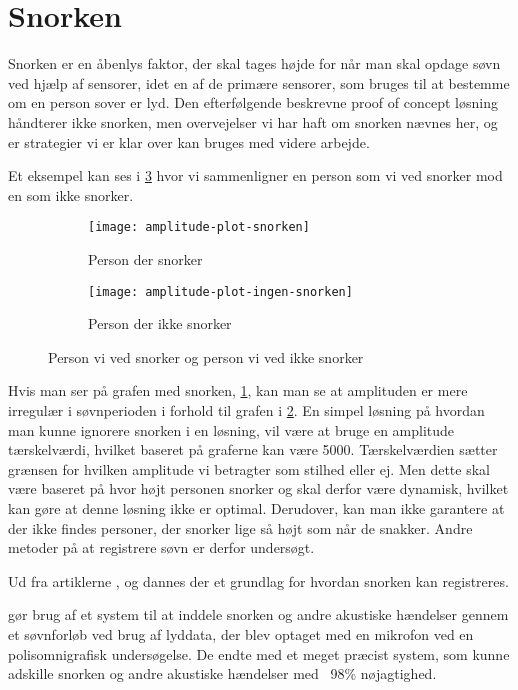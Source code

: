 \section{Snorken}\label{section:snorken}
Snorken er en åbenlys faktor, der skal tages højde for når man skal opdage søvn ved hjælp af sensorer, idet en af de primære sensorer, som bruges til at bestemme om en person sover er lyd.
Den efterfølgende beskrevne proof of concept løsning håndterer ikke snorken, men overvejelser vi har haft om snorken nævnes her, og er strategier vi er klar over kan bruges med videre arbejde.

Et eksempel kan ses i \cref{fig:snorke-vs-ikkesnorken} hvor vi sammenligner en person som vi ved snorker mod en som ikke snorker.

\begin{figure}[h]
\begin{subfigure}{0.49\textwidth}
\texttt{[image: amplitude-plot-snorken]}
\caption{Person der snorker}
\label{fig:person-snorker}
\end{subfigure}
\begin{subfigure}{0.49\textwidth}
\texttt{[image: amplitude-plot-ingen-snorken]}
\caption{Person der ikke snorker}
\label{fig:person-ikke-snorker}
\end{subfigure}
\caption{Person vi ved snorker og person vi ved ikke snorker}
\label{fig:snorke-vs-ikkesnorken}
\end{figure}

Hvis man ser på grafen med snorken, \cref{fig:person-snorker}, kan man se at amplituden er mere irregulær i søvnperioden i forhold til grafen i \cref{fig:person-ikke-snorker}.
En simpel løsning på hvordan man kunne ignorere snorken i en løsning, vil være at bruge en amplitude tærskelværdi, hvilket baseret på graferne kan være 5000. 
Tærskelværdien sætter grænsen for hvilken amplitude vi betragter som stilhed eller ej.
Men dette skal være baseret på hvor højt personen snorker og skal derfor være dynamisk, hvilket kan gøre at denne løsning ikke er optimal. 
Derudover, kan man ikke garantere at der ikke findes personer, der snorker lige så højt som når de snakker.
Andre metoder på at registrere søvn er derfor undersøgt.

Ud fra artiklerne \citet{Dafna2013}, \citet{Calabrese20111101} og \citet{7051338} dannes der et grundlag for hvordan snorken kan registreres.

\citet{Dafna2013} gør brug af et system til at inddele snorken og andre akustiske hændelser gennem et søvnforløb ved brug af lyddata, der blev optaget med en mikrofon ved en polisomnigrafisk undersøgelse. 
De endte med et meget præcist system, som kunne adskille snorken og andre akustiske hændelser med ~98\% nøjagtighed.


